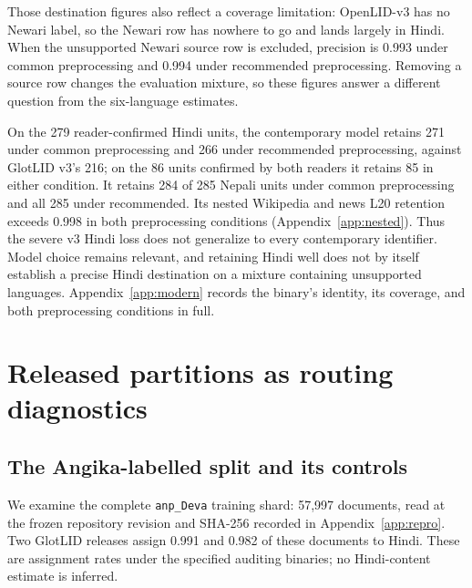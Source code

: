 \documentclass[final]{clv2025}
\newcommand{\lab}[1]{\texttt{#1}}
\newcommand{\fitexhibit}[1]{\sbox{\exhibitbox}{}\ifdim\wd\exhibitbox>\linewidth\resizebox{\linewidth}{!}{\usebox{\exhibitbox}}\else\usebox{\exhibitbox}\fi}
\newcommand{\exhibit}[1]{\fitexhibit{tables/#1.tex}}
\begin{document}
Those destination figures also reflect a coverage limitation: OpenLID-v3 has no Newari label, so the Newari row has nowhere to go and lands largely in Hindi. When the unsupported Newari source row is excluded, precision is 0.993 under common preprocessing and 0.994 under recommended preprocessing. Removing a source row changes the evaluation mixture, so these figures answer a different question from the six-language estimates.

On the 279 reader-confirmed Hindi units, the contemporary model retains 271 under common preprocessing and 266 under recommended preprocessing, against GlotLID v3's 216; on the 86 units confirmed by both readers it retains 85 in either condition. It retains 284 of 285 Nepali units under common preprocessing and all 285 under recommended. Its nested Wikipedia and news L20 retention exceeds 0.998 in both preprocessing conditions (Appendix~\ref{app:nested}). Thus the severe v3 Hindi loss does not generalize to every contemporary identifier. Model choice remains relevant, and retaining Hindi well does not by itself establish a precise Hindi destination on a mixture containing unsupported languages. Appendix~\ref{app:modern} records the binary's identity, its coverage, and both preprocessing conditions in full.

\section{Released partitions as routing diagnostics}\label{sec:artifacts}

\subsection{The Angika-labelled split and its controls}\label{sec:angikasplit}

We examine the complete \lab{anp\_Deva} training shard: 57,997 documents, read at the frozen repository revision and SHA-256 recorded in Appendix~\ref{app:repro}. Two GlotLID releases assign 0.991 and 0.982 of these documents to Hindi. These are assignment rates under the specified auditing binaries; no Hindi-content estimate is inferred.

\begin{table}[tb]
\centering\small
\exhibit{angika_audit}
\caption{Shares assigned to Hindi in the Angika-labelled released split and marker-selected Angika controls. The split contains 57,997 whole documents; controls contain 868 selected articles and 3,269 selected sentences. Whole-article controls were measured for v1 and v2 from hash-verified binaries. The columns specify units, not matched length distributions.}
\label{tab:angika}
\end{table}
\end{document}
